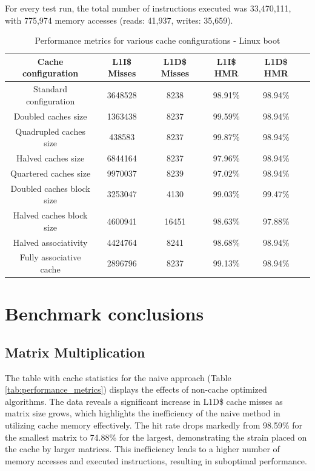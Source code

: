 \noindent For every test run, the total number of instructions executed was 33,470,111, with 775,974 memory accesses (reads: 41,937, writes: 35,659).

\begin{center}
\begin{table}[!htbp]
\centering
\begin{tabular}{|c|c|c|c|c|c|}
\hline
\textbf{Cache configuration}  & \textbf{L1I\$ Misses} & \textbf{L1D\$ Misses} & \textbf{L1I\$ HMR} & \textbf{L1D\$ HMR}\\ \hline
Standard configuration & 3648528 & 8238 & 98.91\% & 98.94\% \\ \hline
Doubled caches size & 1363438 & 8237 & 99.59\% & 98.94\% \\ \hline
Quadrupled caches size & 438583 & 8237 & 99.87\% & 98.94\% \\ \hline
Halved caches size & 6844164 & 8237 & 97.96\% & 98.94\% \\ \hline
Quartered caches size & 9970037 & 8239 & 97.02\% & 98.94\% \\ \hline
Doubled caches block size & 3253047 & 4130 & 99.03\% & 99.47\% \\ \hline
Halved caches block size & 4600941 & 16451 & 98.63\% & 97.88\% \\ \hline
Halved associativity & 4424764 & 8241 & 98.68\% & 98.94\% \\ \hline
Fully associative cache & 2896796 & 8237 & 99.13\% & 98.94\% \\ \hline
\end{tabular}
\caption{Performance metrics for various cache configurations - Linux boot}
\label{tab:performance_metrics_linux}
\end{table}
\end{center}

\section{Benchmark conclusions}

\subsection*{Matrix Multiplication}

The table with cache statistics for the naive approach (Table \ref{tab:performance_metrics}) displays the effects of non-cache optimized algorithms. The data reveals a significant
increase in L1D\$ cache misses as matrix size grows, which highlights the inefficiency of the naive method in utilizing cache memory effectively. The hit rate drops markedly from
98.59\% for the smallest matrix to 74.88\% for the largest, demonstrating the strain placed on the cache by larger matrices. This inefficiency leads to a higher number of memory
accesses and executed instructions, resulting in suboptimal performance.

